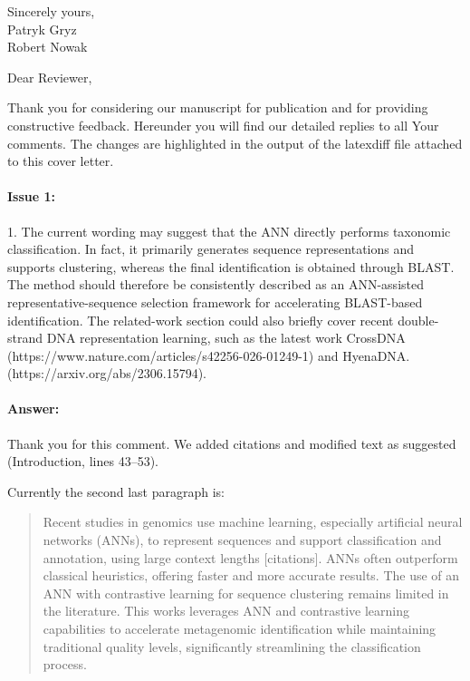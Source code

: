\documentclass{article}
\begin{document}
\vspace{0.25in}

Sincerely yours,\\
Patryk Gryz\\
Robert Nowak\\


\pagebreak

Dear Reviewer,

\vspace{0.25in}

Thank you for considering our manuscript for publication and for providing constructive feedback.
Hereunder you will find our detailed replies to all Your comments.
The changes are highlighted in the output of the latexdiff file attached to this cover letter.

\paragraph{Issue 1:}
\begin{displayquote}
1. The current wording may suggest that the ANN directly performs taxonomic classification. In fact, it primarily generates sequence representations and supports clustering, whereas the final identification is obtained through BLAST. The method should therefore be consistently described as an ANN-assisted representative-sequence selection framework for accelerating BLAST-based identification. The related-work section could also briefly cover recent double-strand DNA representation learning, such as the latest work CrossDNA (https://www.nature.com/articles/s42256-026-01249-1) and HyenaDNA. (https://arxiv.org/abs/2306.15794).
\end{displayquote}

\paragraph{Answer:}

Thank you for this comment. We added citations and modified text as suggested (Introduction, lines 43--53).

Currently the second last paragraph is:

\begin{quote}
    Recent studies in genomics use machine learning, especially artificial neural networks (ANNs), to represent sequences and support classification and annotation, using large context lengths [citations].
    ANNs often outperform classical heuristics, offering faster and more accurate results.
    The use of an ANN with contrastive learning for sequence clustering remains limited in the literature.
    This works leverages ANN  and contrastive learning capabilities to accelerate metagenomic identification while maintaining traditional quality levels, significantly streamlining the classification process.
  \end{quote}
  
\end{document}
